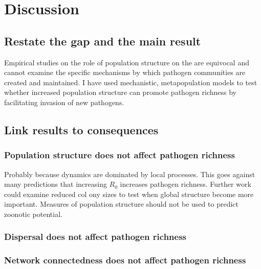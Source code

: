 

\section{Discussion}


\subsection{Restate the gap and the main result}

Empirical studies on the role of population structure on the are equivocal and cannot examine the specific mechanisms by which pathogen communities are created and maintained.
I have used mechanistic, metapopulation models to test whether increased population structure can promote pathogen richness by facilitating invasion of new pathogens.



\subsection{Link results to consequences}

\subsubsection{Population structure does not affect pathogen richness}

Probably because dynamics are dominated by local processes.
This goes against many predictions that increasing $R_0$ increases pathogen richness.
Further work could examine reduced col  ony sizes to test when global structure become more important.
Measures of population structure should not be used to predict zoonotic potential.

\subsubsection{Dispersal does not affect pathogen richness}



\subsubsection{Network connectedness does not affect pathogen richness}

